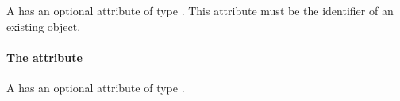 A \Member has an optional attribute  of type
.
This attribute must be the identifier of an existing \SBase object.


\paragraph{The \fixttspace{} attribute}

A \Member has an optional attribute  of type
.


